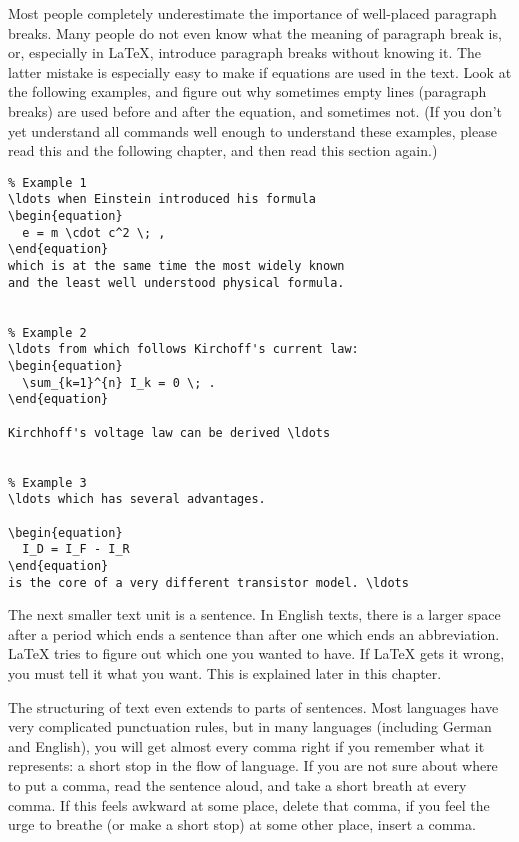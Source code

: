 Most people completely underestimate the importance of well-placed
paragraph breaks.  Many people do not even know what the meaning of
paragraph break is, or, especially in \LaTeX, introduce paragraph
breaks without knowing it.  The latter mistake is especially easy to
make if equations are used in the text.  Look at the following
examples, and figure out why sometimes empty lines (paragraph breaks)
are used before and after the equation, and sometimes not.  (If you
don't yet understand all commands well enough to understand these
examples, please read this and the following chapter, and then read
this section again.)

\begin{code}
\begin{verbatim}
% Example 1
\ldots when Einstein introduced his formula 
\begin{equation} 
  e = m \cdot c^2 \; , 
\end{equation} 
which is at the same time the most widely known 
and the least well understood physical formula. 


% Example 2
\ldots from which follows Kirchoff's current law:
\begin{equation} 
  \sum_{k=1}^{n} I_k = 0 \; .
\end{equation} 

Kirchhoff's voltage law can be derived \ldots


% Example 3
\ldots which has several advantages.

\begin{equation} 
  I_D = I_F - I_R
\end{equation} 
is the core of a very different transistor model. \ldots
\end{verbatim}
\end{code} 

The next smaller text unit is a sentence.  In English texts, there is
a larger space after a period which ends a sentence than after one
which ends an abbreviation.  \LaTeX{} tries to figure out which one
you wanted to have.  If \LaTeX{} gets it wrong, you must tell it what
you want.  This is explained later in this chapter.

The structuring of text even extends to parts of sentences.  Most
languages have very complicated punctuation rules, but in many
languages (including German and English), you will get almost every
comma right if you remember what it represents: a short stop in the
flow of language.  If you are not sure about where to put a comma,
read the sentence aloud, and take a short breath at every comma.  If
this feels awkward at some place, delete that comma, if you feel the
urge to breathe (or make a short stop) at some other place, insert a
comma.

